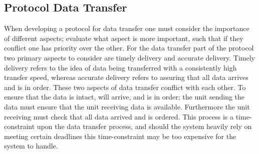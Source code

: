 \subsection{Protocol Data Transfer} %
When developing a protocol for data transfer one must consider the importance of different aspects; evaluate what aspect is more important, such that if they conflict one has priority over the other.
For the data transfer part of the protocol two primary aspects to consider are timely delivery and accurate delivery.
Timely delivery refers to the idea of data being transferred with a consistently high transfer speed, whereas accurate delivery refers to assuring that all data arrives and is in order.
These two aspects of data transfer conflict with each other.
To ensure that the data is intact, will arrive, and is in order; the unit sending the data must ensure that the unit receiving data is available. 
Furthermore the unit receiving must check that all data arrived and is ordered.
This process is a time-constraint upon the data transfer process, and should the system heavily rely on meeting certain deadlines this time-constraint may be too expensive for the system to handle.

